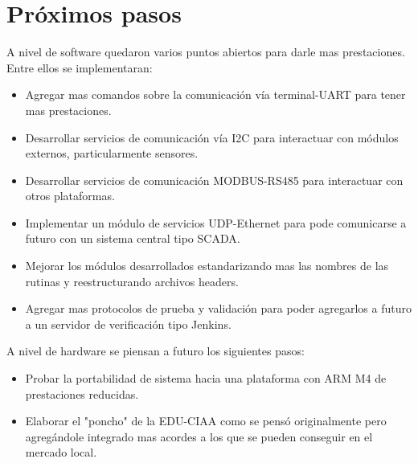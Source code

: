 \section{ Próximos pasos }

A nivel de software quedaron varios puntos abiertos para darle mas prestaciones. Entre ellos se implementaran:
\begin{itemize}
\item Agregar mas comandos sobre la comunicación vía terminal-UART para tener mas prestaciones. 
\item Desarrollar servicios de comunicación vía I2C para interactuar con módulos externos, particularmente sensores.
\item Desarrollar servicios de comunicación MODBUS-RS485 para interactuar con otros plataformas.
\item Implementar un módulo de servicios UDP-Ethernet para pode comunicarse a futuro con un sistema central tipo SCADA.
\item Mejorar los módulos desarrollados estandarizando mas las nombres de las rutinas y reestructurando archivos headers.
\item Agregar mas protocolos de prueba y validación para poder agregarlos a futuro a un servidor de verificación tipo Jenkins.
\end{itemize}

A nivel de hardware se piensan a futuro los siguientes pasos:
\begin{itemize}
\item Probar la portabilidad de sistema hacia una plataforma con ARM M4 de prestaciones reducidas.
\item Elaborar el "poncho" de la EDU-CIAA como se pensó originalmente pero agregándole integrado mas acordes a los que se pueden conseguir en el mercado local.
\end{itemize}
